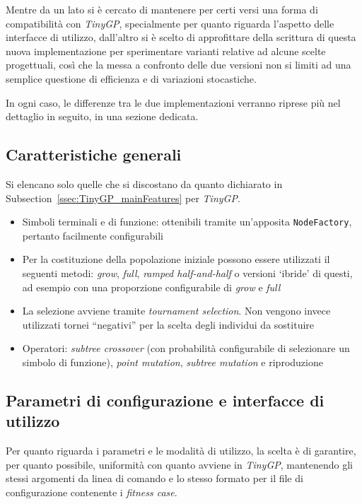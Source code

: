 \documentclass{../llncs}
\newcommand{\xss}[1]{\subsectionname~\ref{ssec:#1}}
\newcommand{\subsectionname}{Subsection}
\begin{document}
Mentre da un lato si è cercato di mantenere per certi versi una forma di compatibilità con \emph{TinyGP}, specialmente per quanto riguarda l'aspetto delle interfacce di utilizzo, dall'altro si è scelto di approfittare della scrittura di questa nuova implementazione per sperimentare varianti relative ad alcune scelte progettuali, così che la messa a confronto delle due versioni non si limiti ad una semplice questione di efficienza e di variazioni stocastiche.

In ogni caso, le differenze tra le due implementazioni verranno riprese più nel dettaglio in seguito, in una sezione dedicata.

\subsection{Caratteristiche generali}
Si elencano solo quelle che si discostano da quanto dichiarato in \xss{TinyGP_mainFeatures} per \emph{TinyGP}.
\begin{itemize}
\item Simboli terminali e di funzione: ottenibili tramite un'apposita \texttt{NodeFactory}, pertanto facilmente configurabili
\item Per la costituzione della popolazione iniziale possono essere utilizzati il seguenti metodi: \emph{grow}, \emph{full}, \emph{ramped half-and-half} o versioni `ibride' di questi, ad esempio con una proporzione configurabile di \emph{grow} e \emph{full}
\item La selezione avviene tramite \emph{tournament selection}. Non vengono invece utilizzati tornei ``negativi'' per la scelta degli individui da sostituire
\item Operatori: \emph{subtree crossover} (con probabilità configurabile di selezionare un simbolo di funzione), \emph{point mutation}, \emph{subtree mutation} e riproduzione
\end{itemize}

\subsection{Parametri di configurazione e interfacce di utilizzo}
Per quanto riguarda i parametri e le modalità di utilizzo, la scelta è di garantire, per quanto possibile, uniformità con quanto avviene in \emph{TinyGP}, mantenendo gli stessi argomenti da linea di comando e lo stesso formato per il file di configurazione contenente i \emph{fitness case}.
\end{document}
